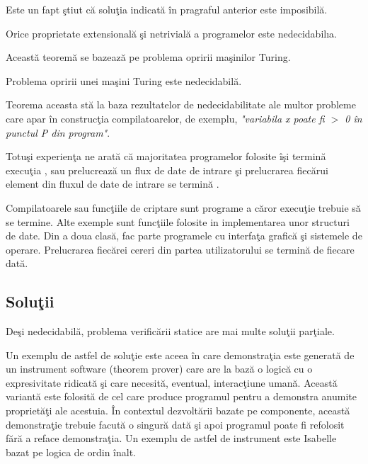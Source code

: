 Este un fapt \c stiut c\u a solu\c tia indicat\u a \^ in pragraful anterior este imposibil\u a.

\begin{theorem}[Rice]
Orice proprietate extensional\u a \c si netrivial\u a a programelor este nedecidabil\i a.
\end{theorem}

Aceast\u a teorem\u a se bazeaz\u a pe problema opririi ma\c sinilor Turing.

\begin{theorem}[Turing,1936]
Problema opririi unei ma\c sini Turing este nedecidabil\u a.
\end{theorem}

Teorema aceasta st\u a la baza rezultatelor de nedecidabilitate ale multor probleme care apar  \^ in construc\c tia compilatoarelor, de exemplu, \emph{"variabila x poate fi $>$ 0  \^ in punctul P din program"}.

Totu\c si experien\c ta ne arat\u a c\u a majoritatea programelor folosite  \^ i\c si termin\u a execu\c tia , sau prelucreaz\u a un flux de date de intrare \c si prelucrarea fiec\u arui element din fluxul de date de intrare se termin\u a .

\begin{example}
Compilatoarele sau func\c tiile de criptare sunt programe a c\u aror execu\c tie trebuie s\u a se termine. Alte exemple sunt func\c tiile folosite in implementarea unor structuri de date. Din a doua clas\u a, fac parte programele cu interfa\c ta grafic\u a \c si sistemele de operare. Prelucrarea fiec\u arei cereri din partea utilizatorului se termin\u a de fiecare dat\u a.
\end{example}

\subsection{Solu\c tii}

De\c si nedecidabil\u a, problema verific\u arii statice are mai multe solu\c tii par\c tiale.

Un exemplu de astfel de solu\c tie este aceea  \^ in care demonstra\c tia este generat\u a de un instrument software (theorem prover) care are la baz\u a o logic\u a cu o expresivitate ridicat\u a \c si care necesit\u a, eventual, interac\c tiune uman\u a. Aceast\u a variant\u a este folosit\u a de cel care produce programul pentru a demonstra anumite propriet\u a\c ti ale acestuia.  \^ In contextul dezvolt\u arii bazate pe componente, aceast\u a demonstra\c tie trebuie facut\u a o singur\u a dat\u a \c si apoi programul poate fi refolosit f\u ar\u a a reface demonstra\c tia. Un exemplu de astfel de instrument este Isabelle bazat pe logica de ordin  \^ inalt.


